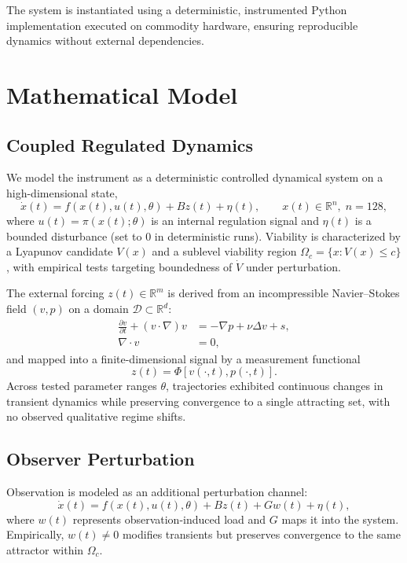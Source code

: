 \documentclass[12pt,a4paper]{report}
\begin{document}
The system is instantiated using a deterministic, instrumented Python implementation executed on commodity hardware, ensuring reproducible dynamics without external dependencies.

\section{Mathematical Model}

\subsection{Coupled Regulated Dynamics}

We model the instrument as a deterministic controlled dynamical system on a high-dimensional state,
\begin{equation}
\dot{x}(t)= f(x(t),u(t),\theta) + B z(t) + \eta(t), \qquad x(t)\in\mathbb{R}^{n},\; n=128,
\end{equation}
where $u(t)=\pi(x(t);\theta)$ is an internal regulation signal and $\eta(t)$ is a bounded disturbance (set to $0$ in deterministic runs). Viability is characterized by a Lyapunov candidate $V(x)$ and a sublevel viability region $\Omega_c=\{x:V(x)\le c\}$, with empirical tests targeting boundedness of $\dot V$ under perturbation.

The external forcing $z(t)\in\mathbb{R}^m$ is derived from an incompressible Navier--Stokes field $(v,p)$ on a domain $\mathcal{D}\subset\mathbb{R}^d$:
\begin{align}
\frac{\partial v}{\partial t} + (v\cdot\nabla)v &= -\nabla p + \nu \Delta v + s,\\
\nabla\cdot v &= 0,
\end{align}
and mapped into a finite-dimensional signal by a measurement functional
\begin{equation}
z(t)=\Phi[v(\cdot,t),p(\cdot,t)].
\end{equation}
Across tested parameter ranges $\theta$, trajectories exhibited continuous changes in transient dynamics while preserving convergence to a single attracting set, with no observed qualitative regime shifts.

\subsection{Observer Perturbation}

Observation is modeled as an additional perturbation channel:
\begin{equation}
\dot{x}(t)= f(x(t),u(t),\theta) + B z(t) + G w(t) + \eta(t),
\end{equation}
where $w(t)$ represents observation-induced load and $G$ maps it into the system. Empirically, $w(t)\neq 0$ modifies transients but preserves convergence to the same attractor within $\Omega_c$.
\end{document}
